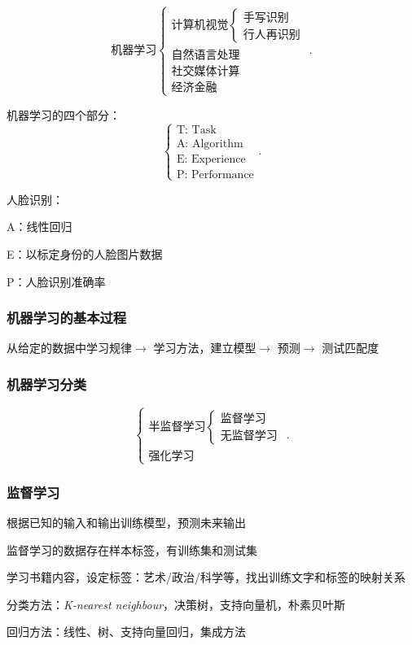 \[
    \text{机器学习}\begin{cases}
        \text{计算机视觉}
        \begin{cases}
            \text{手写识别}\\
            \text{行人再识别}
        \end{cases} \\
        \text{自然语言处理}\\
        \text{社交媒体计算}\\
        \text{经济金融}
    \end{cases}
.\] 

机器学习的四个部分：
\[
    \begin{cases}
        \text{T: Task}\\
        \text{A: Algorithm}\\
        \text{E: Experience}\\
        \text{P: Performance}
    \end{cases}
.\] 
\begin{eg}
    人脸识别：

    A：线性回归

    E：以标定身份的人脸图片数据

    P：人脸识别准确率
\end{eg}
\subsubsection*{机器学习的基本过程}%
\label{subsub:机器学习的基本过程}
从给定的数据中学习规律$\to $ 学习方法，建立模型$\to $ 预测$\to $ 测试匹配度
\subsubsection*{机器学习分类}%
\label{subsub:机器学习分类}
\[
    \begin{cases}
        \text{半监督学习}\begin{cases}
            \text{监督学习}\\
            \text{无监督学习}
        \end{cases}\\
        \text{强化学习}
    \end{cases}
.\] 
\subsubsection{监督学习}%
\label{subsub:监督学习}
\begin{defi}
    根据已知的输入和输出训练模型，预测未来输出
\end{defi}
监督学习的数据存在样本标签，有训练集和测试集
\begin{eg}
    学习书籍内容，设定标签：艺术/政治/科学等，找出训练文字和标签的映射关系
\end{eg}
\begin{notation}
    分类方法：\textit{K-nearest neighbour}，决策树，支持向量机，朴素贝叶斯

    回归方法：线性、树、支持向量回归，集成方法
\end{notation}


